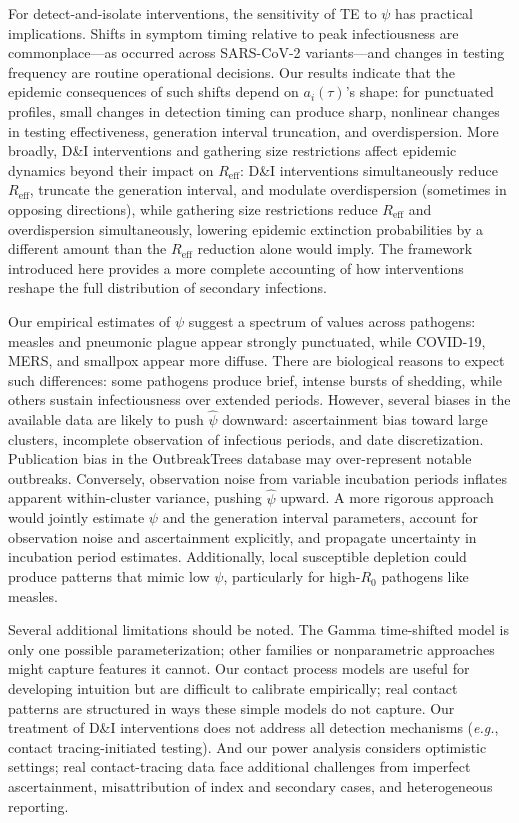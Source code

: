 \documentclass[10pt]{article}
\makeatletter
\newcommand{\eg}{\textit{e.g.}\@\xspace}
\makeatother
\begin{document}
For detect-and-isolate interventions, the sensitivity of TE to $\psi$ has practical implications. Shifts in symptom timing relative to peak infectiousness are commonplace---as occurred across SARS-CoV-2 variants---and changes in testing frequency are routine operational decisions. Our results indicate that the epidemic consequences of such shifts depend on $a_i(\tau)$'s shape: for punctuated profiles, small changes in detection timing can produce sharp, nonlinear changes in testing effectiveness, generation interval truncation, and overdispersion. More broadly, D\&I interventions and gathering size restrictions affect epidemic dynamics beyond their impact on $R_\text{eff}$: D\&I interventions simultaneously reduce $R_\text{eff}$, truncate the generation interval, and modulate overdispersion (sometimes in opposing directions), while gathering size restrictions reduce $R_\text{eff}$ and overdispersion simultaneously, lowering epidemic extinction probabilities by a different amount than the $R_\text{eff}$ reduction alone would imply. The framework introduced here provides a more complete accounting of how interventions reshape the full distribution of secondary infections.

Our empirical estimates of $\psi$ suggest a spectrum of values across pathogens: measles and pneumonic plague appear strongly punctuated, while COVID-19, MERS, and smallpox appear more diffuse. There are biological reasons to expect such differences: some pathogens produce brief, intense bursts of shedding, while others sustain infectiousness over extended periods. However, several biases in the available data are likely to push $\hat{\psi}$ downward: ascertainment bias toward large clusters, incomplete observation of infectious periods, and date discretization. Publication bias in the OutbreakTrees database may over-represent notable outbreaks. Conversely, observation noise from variable incubation periods inflates apparent within-cluster variance, pushing $\hat{\psi}$ upward. A more rigorous approach would jointly estimate $\psi$ and the generation interval parameters, account for observation noise and ascertainment explicitly, and propagate uncertainty in incubation period estimates. Additionally, local susceptible depletion could produce patterns that mimic low $\psi$, particularly for high-$R_0$ pathogens like measles.

Several additional limitations should be noted. The Gamma time-shifted model is only one possible parameterization; other families or nonparametric approaches might capture features it cannot. Our contact process models are useful for developing intuition but are difficult to calibrate empirically; real contact patterns are structured in ways these simple models do not capture. Our treatment of D\&I interventions does not address all detection mechanisms (\eg, contact tracing-initiated testing). And our power analysis considers optimistic settings; real contact-tracing data face additional challenges from imperfect ascertainment, misattribution of index and secondary cases, and heterogeneous reporting.
\end{document}
